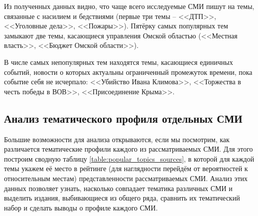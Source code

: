 Из полученных данных видно, что чаще всего исследуемые СМИ пишут на темы, связанные с насилием и бедствиями (первые три темы -- <<ДТП>>, <<Уголовные дела>>, <<Пожары>>). Пятёрку самых популярных тем замыкают две темы, касающиеся управления Омской областью (<<Местная власть>>, <<Бюджет Омской области>>).

В числе самых непопулярных тем находятся темы, касающиеся единичных событий, новости о которых актуальны ограниченный промежуток времени, пока событие себя не исчерпало: <<Убийство Ивана Климова>>, <<Торжества в честь победы в ВОВ>>, <<Присоединение Крыма>>.

\subsection{Анализ тематического профиля отдельных СМИ}\label{text:topics_by_sources}
Большие возможности для анализа открываются, если мы посмотрим, как различается тематические профили каждого из рассматриваемых СМИ. Для этого построим сводную таблицу \ref{table:popular_topics_sources}, в которой для каждой темы укажем её место в рейтинге (для наглядности перейдём от вероятностей к относительным местам) представленности рассматриваемых СМИ. Анализ этих данных позволяет узнать, насколько совпадает тематика различных СМИ и выделить издания, выбивающиеся из общего ряда, сравнить их тематический набор и сделать выводы о профиле каждого СМИ.

